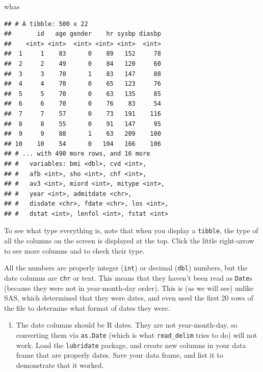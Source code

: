 \documentclass[]{tufte-book}
\newenvironment{Shaded}{}{}
\newcommand{\NormalTok}[1]{#1}
\providecommand{\tightlist}{%
  \setlength{\itemsep}{0pt}\setlength{\parskip}{0pt}}
\theoremstyle{definition}
\theoremstyle{definition}
\theoremstyle{definition}
\theoremstyle{remark}
\begin{document}
\begin{Shaded}
\begin{Highlighting}[]
\NormalTok{whas}
\end{Highlighting}
\end{Shaded}

\begin{verbatim}
## # A tibble: 500 x 22
##       id   age gender    hr sysbp diasbp
##    <int> <int>  <int> <int> <int>  <int>
##  1     1    83      0    89   152     78
##  2     2    49      0    84   120     60
##  3     3    70      1    83   147     88
##  4     4    70      0    65   123     76
##  5     5    70      0    63   135     85
##  6     6    70      0    76    83     54
##  7     7    57      0    73   191    116
##  8     8    55      0    91   147     95
##  9     9    88      1    63   209    100
## 10    10    54      0   104   166    106
## # ... with 490 more rows, and 16 more
## #   variables: bmi <dbl>, cvd <int>,
## #   afb <int>, sho <int>, chf <int>,
## #   av3 <int>, miord <int>, mitype <int>,
## #   year <int>, admitdate <chr>,
## #   disdate <chr>, fdate <chr>, los <int>,
## #   dstat <int>, lenfol <int>, fstat <int>
\end{verbatim}

To see what type everything is, note that when you display a
\texttt{tibble}, the type of all the columns on the screen is displayed
at the top. Click the little right-arrow to see more columns and to
check their type.

All the numbers are properly integer (\texttt{int}) or decimal
(\texttt{dbl}) numbers, but the date columns are \texttt{chr} or text.
This means that they haven't been read as \texttt{Date}s (because they
were not in year-month-day order). This is (as we will see) unlike SAS,
which determined that they were dates, and even used the first 20 rows
of the file to determine what format of dates they were.

\begin{enumerate}
\def\labelenumi{(\alph{enumi})}
\setcounter{enumi}{1}
\tightlist
\item
  The date columns should be R dates. They are not year-month-day, so
  converting them via \texttt{as.Date} (which is what
  \texttt{read\_delim} tries to do) will not work. Load the
  \texttt{lubridate} package, and create new columns in your data frame
  that are properly dates. Save your data frame, and list it to
  demonstrate that it worked.
\end{enumerate}
\end{document}
